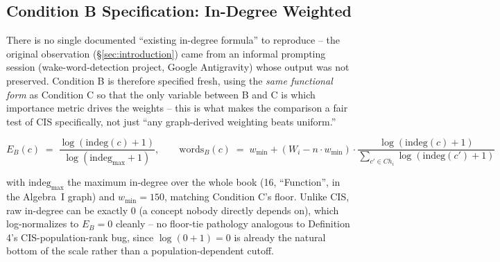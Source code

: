 \subsection{Condition B Specification: In-Degree Weighted}
\label{sec:condition-b}

There is no single documented ``existing in-degree formula'' to reproduce --
the original observation (\S\ref{sec:introduction}) came from an informal
prompting session (wake-word-detection project, Google Antigravity) whose
output was not preserved. Condition B is therefore specified fresh, using
the \emph{same functional form} as Condition C so that the only variable
between B and C is which importance metric drives the weights -- this is
what makes the comparison a fair test of CIS specifically, not just ``any
graph-derived weighting beats uniform.''

\[
E_B(c) \;=\; \frac{\log(\mathrm{indeg}(c) + 1)}{\log(\mathrm{indeg}_{\max} + 1)}, \qquad
\mathrm{words}_B(c) \;=\; w_{\min} + (W_i - n \cdot w_{\min}) \cdot \frac{\log(\mathrm{indeg}(c)+1)}{\sum_{c' \in Ch_i} \log(\mathrm{indeg}(c')+1)}
\]

with $\mathrm{indeg}_{\max}$ the maximum in-degree over the whole book (16,
``Function'', in the Algebra~I graph) and $w_{\min}=150$, matching Condition
C's floor. Unlike CIS, raw in-degree can be exactly 0 (a concept nobody
directly depends on), which log-normalizes to $E_B=0$ cleanly -- no
floor-tie pathology analogous to Definition 4's CIS-population-rank bug,
since $\log(0+1)=0$ is already the natural bottom of the scale rather than a
population-dependent cutoff.

